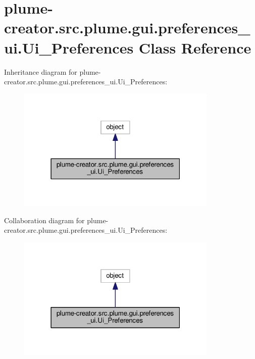 \hypertarget{classplume-creator_1_1src_1_1plume_1_1gui_1_1preferences__ui_1_1_ui___preferences}{}\section{plume-\/creator.src.\+plume.\+gui.\+preferences\+\_\+ui.\+Ui\+\_\+\+Preferences Class Reference}
\label{classplume-creator_1_1src_1_1plume_1_1gui_1_1preferences__ui_1_1_ui___preferences}


Inheritance diagram for plume-\/creator.src.\+plume.\+gui.\+preferences\+\_\+ui.\+Ui\+\_\+\+Preferences\+:\nopagebreak
\begin{figure}[H]
\begin{center}
\leavevmode
\includegraphics[width=271pt]{classplume-creator_1_1src_1_1plume_1_1gui_1_1preferences__ui_1_1_ui___preferences__inherit__graph}
\end{center}
\end{figure}


Collaboration diagram for plume-\/creator.src.\+plume.\+gui.\+preferences\+\_\+ui.\+Ui\+\_\+\+Preferences\+:\nopagebreak
\begin{figure}[H]
\begin{center}
\leavevmode
\includegraphics[width=271pt]{classplume-creator_1_1src_1_1plume_1_1gui_1_1preferences__ui_1_1_ui___preferences__coll__graph}
\end{center}
\end{figure}
